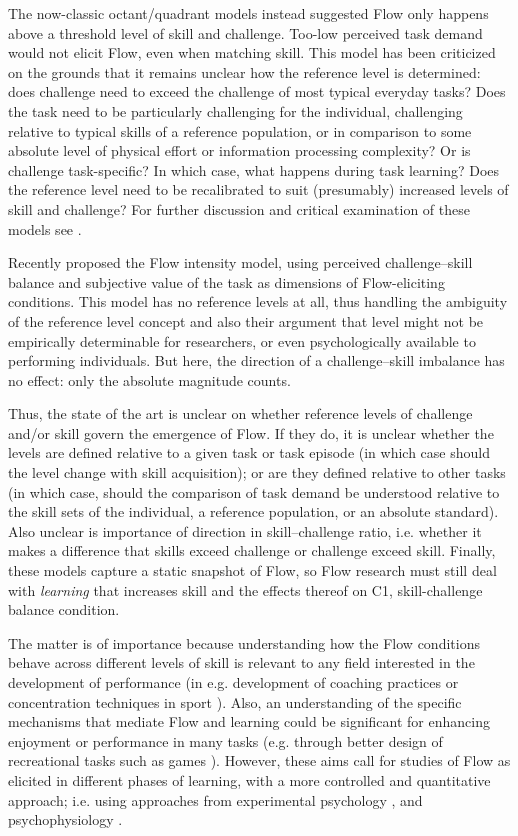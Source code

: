 \documentclass[a4paper,doc,floatsintext,natbib,10pt]{apa6}
\begin{document}
The now-classic octant/quadrant models \citep{Massimini1988} instead suggested Flow only happens above a threshold level of skill and challenge. Too-low perceived task demand would not elicit Flow, even when matching skill. This model has been criticized on the grounds that it remains unclear how the reference level is determined: does challenge need to exceed the challenge of most typical everyday tasks? Does the task need to be particularly challenging for the individual, challenging relative to typical skills of a reference population, or in comparison to some absolute level of physical effort or information processing complexity? Or is challenge task-specific? In which case, what happens during task learning? Does the reference level need to be recalibrated to suit (presumably) increased levels of skill and challenge? For further discussion and critical examination of these models see \cite{Moneta2012,Keller2012}.

Recently \citet[pp-56]{Keller2012} proposed the Flow intensity model, using perceived challenge--skill balance and subjective value of the task as dimensions of Flow-eliciting conditions. This model has no reference levels at all, thus handling the ambiguity of the reference level concept and also their argument that level might not be empirically determinable for researchers, or even psychologically available to performing individuals. But here, the direction of a challenge--skill imbalance has no effect: only the absolute magnitude counts.

Thus, the state of the art is unclear on whether reference levels of challenge and/or skill govern the emergence of Flow. If they do, it is unclear whether the levels are defined relative to a given task or task episode (in which case should the level change with skill acquisition); or are they defined relative to other tasks (in which case, should the comparison of task demand be understood relative to the skill sets of the individual, a reference population, or an absolute standard). Also unclear is importance of direction in skill--challenge ratio, i.e. whether it makes a difference that skills exceed challenge or challenge exceed skill. Finally, these models capture a static snapshot of Flow, so Flow research must still deal with \textit{learning} that increases skill and the effects thereof on {\sf C1}, skill-challenge balance condition.

The matter is of importance because understanding how the Flow conditions behave across different levels of skill is relevant to any field interested in the development of performance (in e.g. development of coaching practices or concentration techniques in sport \citep{Jackson1996}). Also, an understanding of the specific mechanisms that mediate Flow and learning could be significant for enhancing enjoyment or performance in many tasks (e.g. through better design of recreational tasks such as games \citep{Chen2007}). However, these aims call for studies of Flow as elicited in different phases of learning, with a more controlled and quantitative approach; i.e. using approaches from experimental psychology \citep{Harris2017,Keller2008}, and psychophysiology \citep{Peifer2012,Peifer2014,Wolf2015,Harmat2015,Labonte-LeMoyne2016}.
\end{document}
